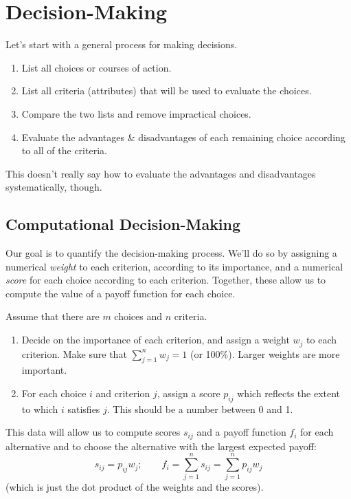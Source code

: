 





\section*{Decision-Making}
Let's start with a general process for 
making decisions. 

\begin{enumerate}
\item List all choices or courses of action.
\item List all criteria (attributes) that will be used to evaluate the choices.
\item Compare the two lists and remove impractical choices.
\item Evaluate the advantages \& disadvantages of each remaining choice
according to all of the criteria.
\end{enumerate}

This doesn't really say how to evaluate the advantages and disadvantages
systematically, though. 

\subsection*{Computational Decision-Making}
Our goal is to quantify the decision-making process. We'll do so by assigning 
a numerical \emph{weight} to each criterion, according to its importance, and a
numerical \emph{score} for each choice according to each criterion.
Together, these allow us to compute the value of a payoff function for
each choice.

Assume that there are $m$ choices and $n$ criteria. 
\begin{enumerate}
\item Decide on the importance of each criterion, and assign a weight
  $w_j$ to each criterion. Make sure that $\sum_{j=1}^n w_j = 1$ (or
  100\%). Larger weights are more important.
\item For each choice $i$ and criterion $j$, assign a score $p_{ij}$
  which reflects the extent to which $i$ satisfies $j$. This should be
  a number between 0 and 1.
\end{enumerate}
This data will allow us to compute scores $s_{ij}$ and a payoff
function $f_i$ for each alternative and to choose the alternative with
the largest expected payoff:
\[ s_{ij} = p_{ij} w_j; \qquad f_i = \sum_{j=1}^n s_{ij} = \sum_{j=1}^n p_{ij} w_j \]
(which is just the dot product of the weights and the scores).

